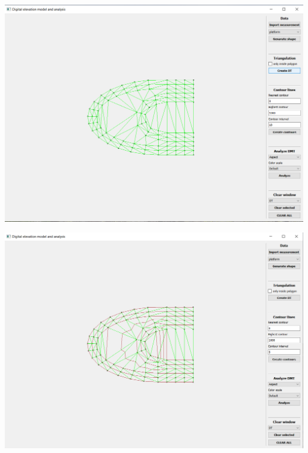 \documentclass[12pt]{article}
\begin{document}
\begin{center}
   \includegraphics[width=14cm]{./img/platform_DT.png}
\end{center}

\begin{center}
   \includegraphics[width=14cm]{./img/platform_contours.png}
\end{center}
\end{document}
